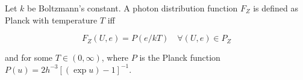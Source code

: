 Let $k$ be Boltzmann's constant. A photon distribution function $F_Z$ is defined as Planck with temperature $T$ iff

$$F_Z(U, e) = P(e/kT) \quad \forall (U, e) \in P_Z$$

and for some $T \in (0, \infty)$, where $P$ is the Planck function $P(u) = 2h^{-3}[(\exp u) - 1]^{-1}$.
